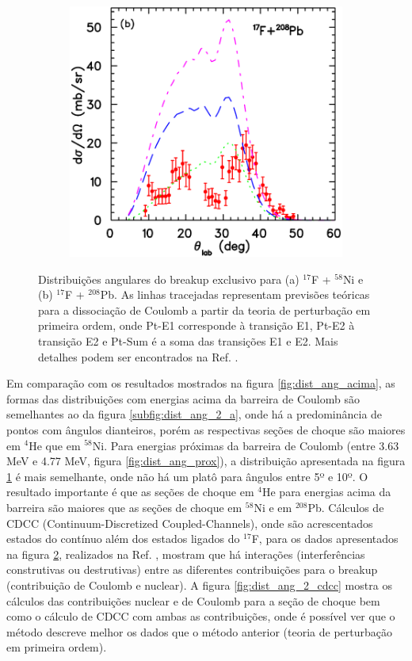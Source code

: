 \documentclass[a4paper,12pt,oneside]{book}
\begin{document}
\begin{figure}[H]
\begin{subfigure}[t]{0.45\textwidth}
        \includegraphics[scale=0.5, width=.97\columnwidth]{figs/17F_208Pb.png}
        \caption{}
        \label{subfig:dist_ang_2_b}
    \end{subfigure}
\caption{Distribuições angulares do breakup exclusivo para (a) $^{17}$F + $^{58}$Ni e (b) $^{17}$F + $^{208}$Pb. As linhas tracejadas representam previsões teóricas para a dissociação de Coulomb a partir da teoria de perturbação em primeira ordem, onde Pt-E1 corresponde à transição E1, Pt-E2 à transição E2 e Pt-Sum é a soma das transições E1 e E2. Mais detalhes podem ser encontrados na Ref. \cite{LIANG200922}.}
\label{fig:dist_ang_2}
\end{figure}

\par Em comparação com os resultados mostrados na figura \ref{fig:dist_ang_acima}, as formas das distribuições com energias acima da barreira de Coulomb são semelhantes ao da figura \ref{subfig:dist_ang_2_a}, onde há a predominância de pontos com ângulos dianteiros, porém as respectivas seções de choque são maiores em $^4$He que em $^{58}$Ni. Para energias próximas da barreira de Coulomb (entre 3.63 MeV e 4.77 MeV, figura \ref{fig:dist_ang_prox}), a distribuição apresentada na figura \ref{subfig:dist_ang_2_b} é mais semelhante, onde não há um platô para ângulos entre 5º e 10º. O resultado importante é que as seções de choque em $^4$He para energias acima da barreira são maiores que as seções de choque em $^{58}$Ni e em $^{208}$Pb. Cálculos de CDCC (Continuum-Discretized Coupled-Channels), onde são acrescentados estados do contínuo além dos estados ligados do $^{17}$F, para os dados apresentados na figura \ref{fig:dist_ang_2}, realizados na Ref. \cite{MORO_BREAKUP}, mostram que há interações (interferências construtivas ou destrutivas) entre as diferentes contribuições para o breakup (contribuição de Coulomb e nuclear). A figura \ref{fig:dist_ang_2_cdcc} mostra os cálculos das contribuições nuclear e de Coulomb para a seção de choque bem como o cálculo de CDCC com ambas as contribuições, onde é possível ver que o método descreve melhor os dados que o método anterior (teoria de perturbação em primeira ordem).
\end{document}
